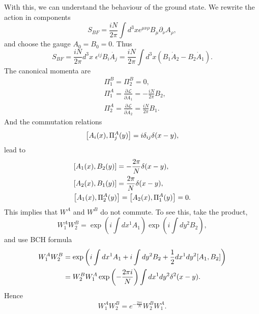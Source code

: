 \documentclass{article}
\begin{document}
With this, we can understand the behaviour of the ground state. We rewrite the action in components 
\begin{equation}
	S_{BF}=\frac{iN}{2\pi}\int d^3x e^{\mu\nu\rho}B_\mu\partial_\nu A_\rho,
\end{equation}
and choose the gauge $A_0=B_0=0$. Thus 
\begin{equation}
	S_{BF}=\frac{iN}{2\pi}d^3x\;\epsilon^{ij}B_i\dot{A_j}=\frac{iN}{2\pi}\int d^3x(B_1\dot{A}_2-B_2\dot{A}_1).
\end{equation}
The canonical momenta are 
\begin{equation}
	\begin{split}
		&\Pi_1^B=\Pi_2^B=0,\\
		&\Pi_1^A=\frac{\partial \mathcal{L}}{\partial \dot{A}_1}=-\frac{iN}{2\pi}B_2,\\
		&\Pi_2^A=\frac{\partial \mathcal{L}}{\partial \dot{A}_2}=\frac{iN}{2\pi}B_1.
	\end{split}
\end{equation}
And the commutation relations 
\begin{equation}
	\comm{A_i(x)}{\Pi_j^A(y)}=i\delta_{ij}\delta(x-y),
\end{equation}
lead to 
\begin{equation}
	\begin{split}
		&\comm{A_1(x)}{B_2(y)}=-\frac{2\pi}{N}\delta(x-y),\\
		&\comm{A_2(x)}{B_1(y)}=\frac{2\pi}{N}\delta(x-y),\\
		&\comm{A_1(x)}{\Pi_2^A(y)}=\comm{A_2(x)}{\Pi_1^A(y)}=0.
	\end{split}
\end{equation}
This implies that $W^A$ and $W^B$ do not commute. To see this, take the product,
\begin{equation}
	W_1^AW_2^B=\exp\left(i\int dx^1A_1\right)\exp\left(i\int dy^2 B_2\right),
\end{equation}
and use BCH formula 
\begin{equation}
	\begin{split}
		W_1^AW_2^B&=\exp\left(i\int dx^1A_1+i\int dy^2B_2+\frac{1}{2}dx^1dy^2\comm{A_1}{B_2}\right)\\
		&=W_2^BW_1^A\exp\left(-\frac{2\pi i}{N}\right)\int dx^1dy^2\delta^2(x-y).
	\end{split}
\end{equation}
Hence 
\begin{equation}\label{non commutation wilson lines}
	W_1^AW_2^B=e^{-\frac{2\pi i}{N}}W_2^BW_1^A. 
\end{equation}
\end{document}
